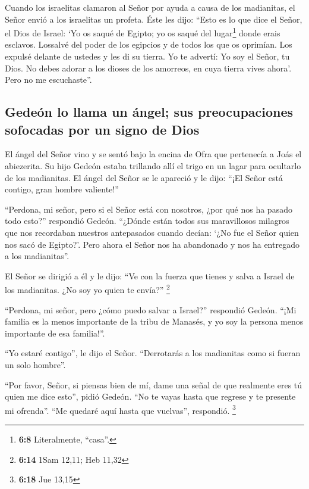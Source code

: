  Cuando los israelitas clamaron al Señor por ayuda a causa
de los madianitas,  el Señor envió a los israelitas un
profeta. Éste les dijo: ``Esto es lo que dice el Señor, el Dios de
Israel: `Yo os saqué de Egipto; yo os saqué del lugar\footnote{\textbf{6:8}
  Literalmente, ``casa''.} donde erais esclavos.  Lossalvé
del poder de los egipcios y de todos los que os oprimían. Los expulsé
delante de ustedes y les di su tierra.  Yo te advertí: Yo
soy el Señor, tu Dios. No debes adorar a los dioses de los amorreos, en
cuya tierra vives ahora'. Pero no me escuchaste''.

\hypertarget{gedeuxf3n-lo-llama-un-uxe1ngel-sus-preocupaciones-sofocadas-por-un-signo-de-dios}{%
\subsection{Gedeón lo llama un ángel; sus preocupaciones sofocadas por
un signo de
Dios}\label{gedeuxf3n-lo-llama-un-uxe1ngel-sus-preocupaciones-sofocadas-por-un-signo-de-dios}}

 El ángel del Señor vino y se sentó bajo la encina de
Ofra que pertenecía a Joás el abiezerita. Su hijo Gedeón estaba
trillando allí el trigo en un lagar para ocultarlo de los madianitas.
 El ángel del Señor se le apareció y le dijo: ``¡El Señor
está contigo, gran hombre valiente!''

 ``Perdona, mi señor, pero si el Señor está con nosotros,
¿por qué nos ha pasado todo esto?'' respondió Gedeón. ``¿Dónde están
todos sus maravillosos milagros que nos recordaban nuestros antepasados
cuando decían: `¿No fue el Señor quien nos sacó de Egipto?'. Pero ahora
el Señor nos ha abandonado y nos ha entregado a los madianitas''.

 El Señor se dirigió a él y le dijo: ``Ve con la fuerza
que tienes y salva a Israel de los madianitas. ¿No soy yo quien te
envía?'' \footnote{\textbf{6:14} 1Sam 12,11; Heb 11,32}

 ``Perdona, mi señor, pero ¿cómo puedo salvar a Israel?''
respondió Gedeón. ``¡Mi familia es la menos importante de la tribu de
Manasés, y yo soy la persona menos importante de esa familia!''.

 ``Yo estaré contigo'', le dijo el Señor. ``Derrotarás a
los madianitas como si fueran un solo hombre''.

 ``Por favor, Señor, si piensas bien de mí, dame una
señal de que realmente eres tú quien me dice esto'', pidió Gedeón.
 ``No te vayas hasta que regrese y te presente mi
ofrenda''. ``Me quedaré aquí hasta que vuelvas'', respondió. \footnote{\textbf{6:18}
  Jue 13,15}


